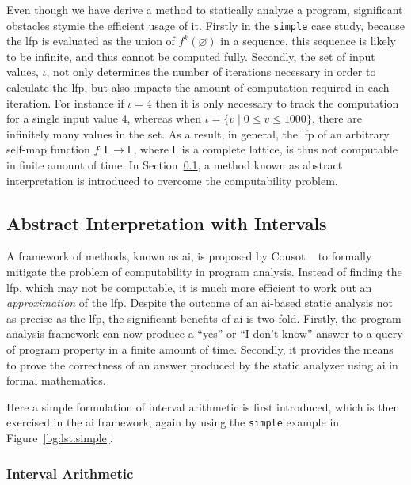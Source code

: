 Even though we have derive a method to statically analyze a program,
significant obstacles stymie the efficient usage of it.  Firstly in the
\verb|simple| case study, because the \gls{lfp} is evaluated as the union of
$f^k(\varnothing)$ in a sequence, this sequence is likely to be infinite, and
thus cannot be computed fully.  Secondly, the set of input values, $\iota$,
not only determines the number of iterations necessary in order to calculate
the \gls{lfp}, but also impacts the amount of computation required in each
iteration.  For instance if $\iota = {4}$ then it is only necessary to track
the computation for a single input value $4$, whereas when $\iota = \{ v \mid
0 \leq v \leq 1000 \}$, there are infinitely many values in the set.  As
a result, in general, the \gls{lfp} of an arbitrary self-map function $f:
\mathsf{L} \to \mathsf{L}$, where $\mathsf{L}$ is a complete lattice, is thus
not computable in finite amount of time.  In Section~\ref{bg:sub:intervals},
a method known as abstract interpretation is introduced to overcome the
computability problem.


\subsection{Abstract Interpretation with Intervals}
\label{bg:sub:intervals}

A framework of methods, known as \gls{ai}, is proposed by Cousot
\etal~\cite{cousot77} to formally mitigate the problem of computability
in program analysis.  Instead of finding the \gls{lfp}, which may not be
computable, it is much more efficient to work out an \emph{approximation} of
the \gls{lfp}\@.  Despite the outcome of an \gls{ai}-based static analysis not
as precise as the \gls{lfp}, the significant benefits of \gls{ai} is two-fold.
Firstly, the program analysis framework can now produce a ``yes'' or ``I don't
know'' answer to a query of program property in a finite amount of time.
Secondly, it provides the means to prove the correctness of an answer produced
by the static analyzer using \gls{ai} in formal mathematics.

Here a simple formulation of interval arithmetic is first introduced, which
is then exercised in the \gls{ai} framework, again by using the \verb|simple|
example in Figure~\ref{bg:lst:simple}.

\subsubsection{Interval Arithmetic}
\label{bg:ssub:interval}

